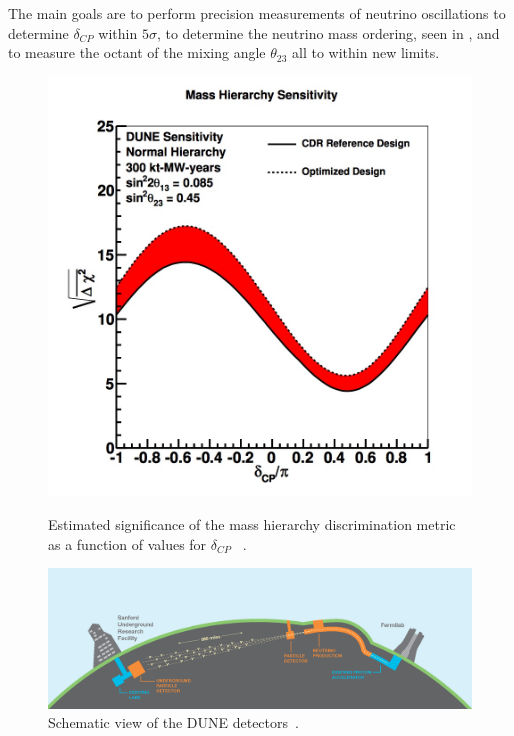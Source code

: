 The main goals are to perform precision measurements of neutrino oscillations to determine $\delta_{CP}$ within $5\sigma$, to determine the neutrino mass ordering, seen in , and to measure the octant of the mixing angle $\theta_{23}$ all to within new limits. 

\begin{figure}[h!]
  \centering
  \begin{minipage}[b]{0.49\textwidth}
    \includegraphics[width=\textwidth]{figures/dune2.jpeg}
    \vspace{2mm}
    \caption{Estimated significance of the mass hierarchy discrimination metric as a function of values for $\delta_{CP}$ ~\cite{23DUNE}.}
    \label{fig:dune1}
  \end{minipage}
  \hfill
  \begin{minipage}[b]{0.49\textwidth}
    \includegraphics[width=\textwidth]{figures/dune.png}
       \vspace{2mm}
    \caption{Schematic view of the DUNE detectors~\cite{23DUNE}.}
     \label{fig:dune2}
  \end{minipage}
\end{figure}

